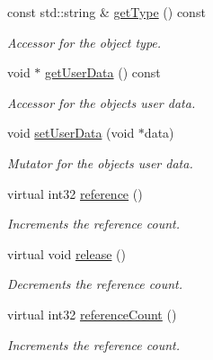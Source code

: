 \begin{DoxyCompactItemize}
const std\+::string \& \mbox{\hyperlink{class_arcana_1_1_object_a2de0f40152fa8b1914a6449456757a24}{get\+Type}} () const
\begin{DoxyCompactList}\small\item\em Accessor for the object type. \end{DoxyCompactList}\item 
\mbox{\label{class_arcana_1_1_object_a8851a34872b31b360d4e574d2d47ba67}} 
void $\ast$ \mbox{\hyperlink{class_arcana_1_1_object_a8851a34872b31b360d4e574d2d47ba67}{get\+User\+Data}} () const
\begin{DoxyCompactList}\small\item\em Accessor for the object\textquotesingle{}s user data. \end{DoxyCompactList}\item 
\mbox{\label{class_arcana_1_1_object_a34092d7ea25f17823e6ccf1e6e110152}} 
void \mbox{\hyperlink{class_arcana_1_1_object_a34092d7ea25f17823e6ccf1e6e110152}{set\+User\+Data}} (void $\ast$data)
\begin{DoxyCompactList}\small\item\em Mutator for the object\textquotesingle{}s user data. \end{DoxyCompactList}\item 
virtual int32 \mbox{\hyperlink{class_arcana_1_1_object_aee21c11c6df1f204288c55cab27139fe}{reference}} ()
\begin{DoxyCompactList}\small\item\em Increments the reference count. \end{DoxyCompactList}\item 
virtual void \mbox{\hyperlink{class_arcana_1_1_object_aa14c503a92c2a630c119c5a21ea040f8}{release}} ()
\begin{DoxyCompactList}\small\item\em Decrements the reference count. \end{DoxyCompactList}\item 
virtual int32 \mbox{\hyperlink{class_arcana_1_1_object_ae9a43cf92c71ea1e5a672b40e9a99f19}{reference\+Count}} ()
\begin{DoxyCompactList}\small\item\em Increments the reference count. \end{DoxyCompactList}\item 
\mbox{\label{class_arcana_1_1_object_af08a90d6cc61992f2908e61b60a31972}} 

\end{DoxyCompactItemize}
